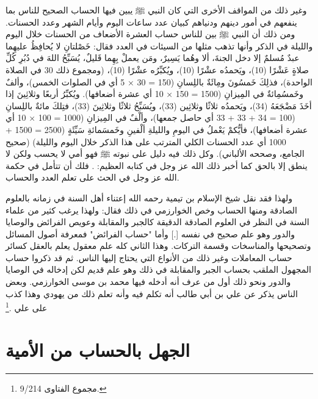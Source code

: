 وغير ذلك من المواقف الأخرى التي كان النبي ﷺ يبين فيها الحساب الصحيح للناس بما ينفعهم في أمور دينهم ودنياهم كبيان عدد ساعات اليوم وأيام الشهر وعدد الحسنات. ومن ذلك أن النبي ﷺ  بين للناس حساب العشرة الأضعاف من الحسنات خلال اليوم والليلة في الذكر وأنها تذهب مثلها من السيئات في العدد فقال: خَصْلتانِ لا يُحافِظُ عليهِما عبدٌ مُسلمٌ إلا دخل الجنةَ، ألا وهُما يَسِيرٌ، ومَن يعملْ بِهِما قَليلٌ، يُسَبِّحُ اللهَ في دُبُرِ كُلِّ صلاةٍ عَشْرًا (10)، ويَحمدُه عشْرًا (10)، ويُكبِّرُه عشْرًا (10)، (ومجموع ذلك 30 في الصلاة الواحدة)، فذلِكَ خَمسُونَ ومِائَةٌ باللِسانِ (150 = 30 × 5 أي في الصلوات الخمس)، وألفٌ وخَمسُمِائةٌ في المِيزانِ (1500 = 150 × 10 أي عشرة أضعافها). ويُكبِّرُ أربعًا وثلاثِينَ إذا أخَذَ مَضْجَعَهُ (34)، ويَحمدُه ثلاثًا وثلاثِين (33)، ويُسَبِّحُ ثلاثًا وثلاثِينَ (33)، فتِلكَ مائةٌ باللِسانِ (100 = 34 + 33 + 33 أي حاصل جمعها)، وألْفٌ في المِيزانِ (1000 = 100 × 10 أي عشرة أضعافها)، فأيُّكمْ يَعْملُ في اليومِ والليلةِ ألْفينِ وخَمسَمائةِ سَيِّئَةٍ (2500 = 1500 + 1000 أي عدد الحسنات الكلي المترتب على هذا الذكر خلال اليوم والليلة) {\footnotesize (صحيح الجامع، وصححه الألباني)}. وكل ذلك فيه دليل على نبوته ﷺ فهو أمي لا يحسب ولكن لا ينطق إلا بالحق كما أخبر ذلك الله عز وجل في كتابه العظيم:
\quranayah*[53][3-4]{\footnotesize \surahname*[53]}. فلك أن تتأمل في حكمة الله عز وجل في الحث على تعلم العدد والحساب.

ولهذا فقد نقل شيخ الإسلام بن تيمية رحمه الله إعتناء أهل السنة في زمانه بالعلوم الصادقة ومنها الحساب وخص الخوارزمي في ذلك فقال: 
ولهذا يرغب كثير من علماء السنة في النظر في العلوم الصادقة الدقيقة كالجبر والمقابلة وعويص الفرائض والوصايا والدور وهو علم صحيح في نفسه [.] وأما "حساب الفرائض" فمعرفة أصول المسائل وتصحيحها والمناسخات وقسمة التركات. وهذا الثاني كله علم معقول يعلم بالعقل كسائر حساب المعاملات وغير ذلك من الأنواع التي يحتاج إليها الناس. ثم قد ذكروا حساب المجهول الملقب بحساب الجبر والمقابلة في ذلك وهو علم قديم لكن إدخاله في الوصايا والدور ونحو ذلك أول من عرف أنه أدخله فيها محمد بن موسى الخوارزمي. وبعض الناس يذكر عن علي بن أبي طالب أنه تكلم فيه وأنه تعلم ذلك من يهودي وهذا كذب على علي
\href{https://shamela.ws/book/7289/4478#p2}{\faExternalLink} \cite{ibnTaimia_Majmoo}.\footnote{مجموع الفتاوى 9/214.} 

\section{الجهل بالحساب من الأمية}

